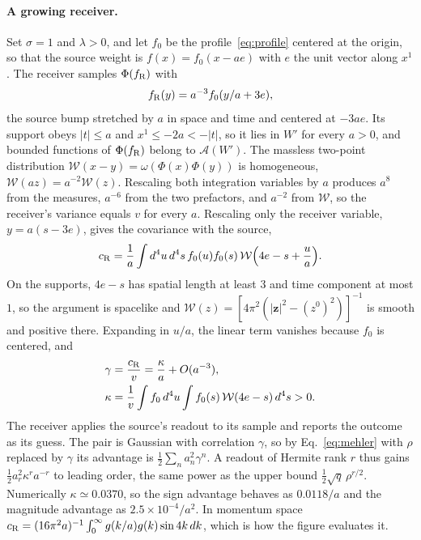 \documentclass[11pt,a4paper]{article}
\newcommand{\A}{\mathcal A}
\begin{document}
\paragraph*{A growing receiver.} Set $\sigma=1$ and $\lambda>0$, and let $f_0$ be the profile~\eqref{eq:profile} centered at the origin, so that the source weight is $f(x)=f_0(x-ae)$ with $e$ the unit vector along $x^1$. The receiver samples $\Phi(f_{\rm R})$ with
\begin{equation}
 f_{\rm R}(y)=a^{-3}f_0(y/a+3e),
\end{equation}
the source bump stretched by $a$ in space and time and centered at $-3ae$. Its support obeys $|t|\le a$ and $x^1\le-2a<-|t|$, so it lies in $W'$ for every $a>0$, and bounded functions of $\Phi(f_{\rm R})$ belong to $\A(W')$. The massless two-point distribution $\mathcal W(x-y)=\omega(\Phi(x)\Phi(y))$ is homogeneous, $\mathcal W(az)=a^{-2}\mathcal W(z)$. Rescaling both integration variables by $a$ produces $a^8$ from the measures, $a^{-6}$ from the two prefactors, and $a^{-2}$ from $\mathcal W$, so the receiver's variance equals $v$ for every $a$. Rescaling only the receiver variable, $y=a(s-3e)$, gives the covariance with the source,
\begin{equation}
 c_{\rm R}=\frac1a\int d^4u\,d^4s\,f_0(u)f_0(s)\,\mathcal W\Bigl(4e-s+\frac ua\Bigr).
\end{equation}
On the supports, $4e-s$ has spatial length at least $3$ and time component at most $1$, so the argument is spacelike and $\mathcal W(z)=[4\pi^2(|\bm z|^2-(z^0)^2)]^{-1}$ is smooth and positive there. Expanding in $u/a$, the linear term vanishes because $f_0$ is centered, and
\begin{equation}
\begin{aligned}
 \gamma&=\frac{c_{\rm R}}{v}=\frac\kappa a+O(a^{-3}),\\
 \kappa&=\frac1v\int f_0\,d^4u\int f_0(s)\,\mathcal W(4e-s)\,d^4s>0 .
\end{aligned}
\end{equation}
The receiver applies the source's readout to its sample and reports the outcome as its guess. The pair is Gaussian with correlation $\gamma$, so by Eq.~\eqref{eq:mehler} with $\rho$ replaced by $\gamma$ its advantage is $\frac12\sum_na_n^2\gamma^n$. A readout of Hermite rank $r$ thus gains $\frac12a_r^2\kappa^ra^{-r}$ to leading order, the same power as the upper bound $\frac12\sqrt q\,\rho^{r/2}$. Numerically $\kappa\simeq0.0370$, so the sign advantage behaves as $0.0118/a$ and the magnitude advantage as $2.5\times10^{-4}/a^2$. In momentum space $c_{\rm R}=(16\pi^2a)^{-1}\int_0^\infty g(k/a)g(k)\sin4k\,dk$, which is how the figure evaluates it.
\end{document}
